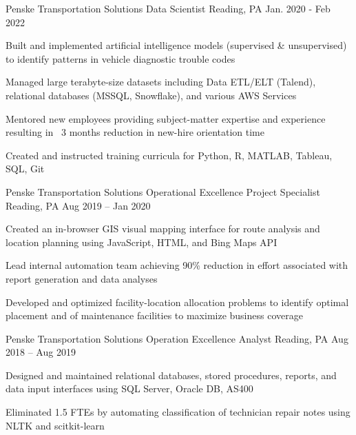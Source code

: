 \begin{cventries}
\cventry
{Penske Transportation Solutions} %
{Data Scientist} %
{Reading, PA} %
{Jan. 2020 - Feb 2022} %
{ %
\begin{cvitems}
\item {Built and implemented artificial intelligence models (supervised \& unsupervised) to identify patterns in vehicle diagnostic trouble codes }
\item {Managed large terabyte-size datasets including Data ETL/ELT (Talend), relational databases (MSSQL, Snowflake), and various AWS Services}
\item {Mentored new employees providing subject-matter expertise and experience resulting in ~3 months reduction in new-hire orientation time}
\item {Created and instructed training curricula for Python, R, MATLAB, Tableau, SQL, Git}
\end{cvitems}
}


\cventry
{Penske Transportation Solutions} %
{Operational Excellence Project Specialist} %
{Reading, PA} %
{Aug 2019 – Jan 2020} %
{ %
\begin{cvitems}
\item {Created an in-browser GIS visual mapping interface for route analysis and location planning using JavaScript, HTML, and Bing Maps API}
\item {Lead internal automation team achieving 90\% reduction in effort associated with report generation and data analyses}
\item {Developed and optimized facility-location allocation problems to identify optimal placement and of maintenance facilities to maximize business coverage}
\end{cvitems}
}


\cventry
{Penske Transportation Solutions} %
{Operation Excellence Analyst} %
{Reading, PA} %
{Aug 2018 – Aug 2019} %
{ %
\begin{cvitems}
\item {Designed and maintained relational databases, stored procedures, reports, and data input interfaces using SQL Server, Oracle DB, AS400}
\item {Eliminated 1.5 FTEs by automating classification of technician repair notes using NLTK and scitkit-learn}
\end{cvitems} 
}


\end{cventries}
